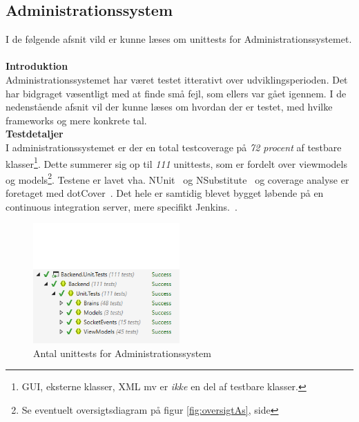 \subsection{Administrationssystem}
I de følgende afsnit vild er kunne læses om unittests for Administrationssystemet.\\\\


\textbf{Introduktion}\\
Administrationssystemet har været testet itterativt over udviklingsperioden. Det har bidgraget væsentligt med at finde små fejl, som ellers var gået igennem. I de nedenstående afsnit vil der kunne læses om hvordan der er testet, med hvilke frameworks og mere konkrete tal.\\



\textbf{Testdetaljer}\\
I administrationssystemet er der en total testcoverage på \textit{72 procent} af testbare klasser\footnote{GUI, eksterne klasser, XML mv er \textit{ikke} en del af testbare klasser.}. Dette summerer sig op til \textit{111} unittests, som er fordelt over viewmodels og models\footnote{Se eventuelt oversigtsdiagram på figur \ref{fig:oversigtAs}, side \pageref{fig:oversigtAs}}. Testene er lavet vha. NUnit~\cite{NUnit} og NSubstitute~\cite{NSubstitute} og coverage analyse er foretaget med dotCover~\cite{dotCover}. Det hele er samtidig blevet bygget løbende på en continuous integration server, mere specifikt Jenkins.~\cite{Jenkins}.

	\begin{figure}[H]
		\centering
		\includegraphics[width=0.50\textwidth]{Test/Images/Backend/AntalUnit.png}
		\caption{Antal unittests for Administrationssystem}
		\label{fig:antalunit}
	\end{figure}

